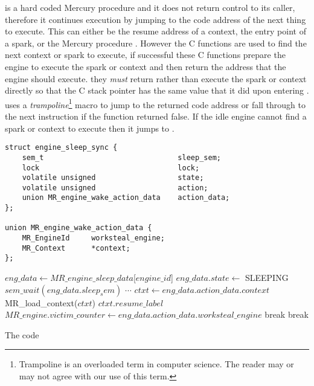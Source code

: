 \idle is a hard coded Mercury procedure and it does not return control to
its caller,
therefore it continues execution by jumping to the code address of the next
thing to execute.
This can either be the resume address of a context,
the entry point of a spark,
or the Mercury procedure \sleep.
However
the C functions are used to find the next context or spark to execute,
if successful these C functions prepare the engine to execute the spark or
context and then return the address that the engine should execute.
they \emph{must} return rather than execute the spark or context directly so
that the C stack pointer has the same value that it did upon entering \idle.
\idle uses a \emph{trampoline}\footnote{
    Trampoline is an overloaded term in computer science.
    The reader may or may not agree with our use of this term.
    }
macro to jump to the returned code
address or fall through to the next instruction if the function returned
false.
If the idle engine cannot find a spark or context to execute then it jumps
to \sleep.

\begin{algorithm}[tbp]
\begin{minipage}{\textwidth}
\begin{verbatim}
struct engine_sleep_sync {
    sem_t                               sleep_sem;
    lock                                lock;
    volatile unsigned                   state;
    volatile unsigned                   action;
    union MR_engine_wake_action_data    action_data;
};

union MR_engine_wake_action_data {      
    MR_EngineId     worksteal_engine;
    MR_Context      *context;
};
\end{verbatim}

\begin{algorithmic}
        \Loop
            \State $eng\_data \gets MR\_engine\_sleep\_data$[$engine\_id$]
            \State $eng\_data.state \gets$ SLEEPING
            \State $sem\_wait(eng\_data.sleep_sem)$
                \State $\cdots$
              \EndCase
                \State $ctxt \gets eng\_data.action\_data.context$
                \State MR\_load\_context($ctxt$)
                \Goto $ctxt.resume\_label$
              \EndCase
                \State $MR\_engine.victim\_counter \gets
                    eng\_data.action\_data.worksteal\_engine$ 
                \State {}
                \State {}
                \State break
              \EndCase
                \State {}
                \State {}
                \State break
              \EndCase
            \EndSwitch
        \EndLoop
    \EndProcedure
\end{algorithmic}

\end{minipage}
\caption{The \sleep code}
\end{algorithm}

